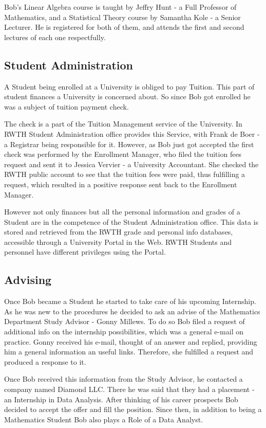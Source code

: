 \documentclass{article}    %
\begin{document}
Bob's Linear Algebra course is taught by Jeffry Hunt - a Full Professor of Mathematics, and a Statistical Theory course by Samantha Kole - a Senior Lecturer. He is registered for both of them, and attends the first and second lectures of each one respectfully.
% 
\subsection{Student Administration}
%
A Student being enrolled at a University is obliged to pay Tuition. This part of student finances a University is concerned about. So since Bob got enrolled he was a subject of tuition payment check. 

The check is a part of the Tuition Management service of the University. In RWTH Student Administration office provides this Service, with Frank de Boer - a Registrar being responsible for it. However, as Bob just got accepted the first check was performed by the Enrollment Manager, who filed the tuition fees request and sent it to Jessica Vervier - a University Accountant. She checked the RWTH public account to see that the tuition fees were paid, thus fulfilling a request, which resulted in a positive response sent back to the Enrollment Manager.

However not only finances but all the personal information and grades of a Student are in the competence of the Student Administration office. This data is stored and retrieved from the RWTH grade and personal info databases, accessible through a University Portal in the Web. RWTH Students and personnel have different privileges using the Portal.
% 
\subsection{Advising}
%
Once Bob became a Student he started to take care of his upcoming Internship. As he was new to the procedures he decided to ask an advise of the Mathematics Department Study Advisor - Gonny Millews. To do so Bob filed a request of additional info on the internship possibilities, which was a general e-mail on practice. Gonny received his e-mail, thought of an answer and replied, providing him a general information an useful links. Therefore, she fulfilled a request and produced a response to it.

Once Bob received this information from the Study Advisor, he contacted a company named Diamond LLC. There he was said that they had a placement - an Internship in Data Analysis. After thinking of his career prospects Bob decided to accept the offer and fill the position. Since then, in addition to being a Mathematics Student Bob also plays a Role of a Data Analyst.
% 
\end{document}
